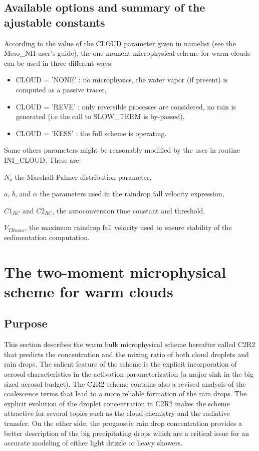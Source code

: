 \subsection{Available options and summary of the ajustable constants}
According to the value of the CLOUD parameter given in  namelist (see the
Meso\_NH user's guide), the one-moment
microphysical scheme for warm clouds can be used in three different ways:
\begin{itemize}
\item
CLOUD = 'NONE' :  no microphysics, the water vapor (if present) is computed
as a passive tracer,
\item
CLOUD = 'REVE' : only reversible processes are considered, no rain is generated
(i.e the call to SLOW\_TERM is by-passed),
\item
CLOUD = 'KESS' : the full scheme is operating.
\end{itemize}

Some others parameters might be reasonably modified  by the user in
routine INI\_CLOUD. These are:

$N_o$ the Marshall-Palmer distribution parameter,

$a$, $b$, and $\alpha$ the parameters used in the raindrop fall velocity
expression,

$C1_{RC}$ and $C2_{RC}$, the autoconversion time constant and threshold,

$V_{TRmax}$, the maximum raindrop fall velocity used to ensure stability of
the sedimentation computation.

\section{The two-moment microphysical scheme for warm clouds}\label{TWOMOM}
%
\subsection{Purpose}
%
This section describes the warm bulk microphysical scheme hereafter called 
C2R2 that predicts the concentration and the mixing ratio of both cloud 
droplets and rain drops. The salient feature of the scheme is the explicit
incorporation of aerosol characteristics in the activation parameterization
(a major sink in the big sized aerosol budget). The C2R2 scheme contains 
also a revised analysis of the coalescence terms that lead to a more reliable
formation of the rain drops. The explicit evolution of the droplet 
concentration in C2R2 makes the scheme attractive for several topics such as 
the cloud chemistry and the radiative transfer. On the other side, the 
prognostic rain drop concentration provides a better description of the big 
precipitating drops which are a critical issue for an accurate modeling of 
either light drizzle or heavy showers.

